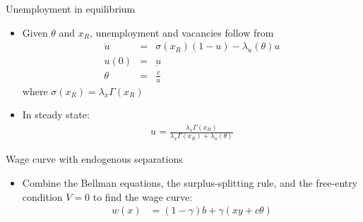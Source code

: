 \documentclass[9pt]{beamer}
\newcommand{\bit}{\begin{itemize}}
\newcommand{\eit}{\end{itemize}}
\newcommand{\lb}{\label}
\begin{document}
\begin{frame}{Unemployment in equilibrium}

\bit
\setlength\itemsep{1em}

\item Given $\theta$ and $x_R$, unemployment and vacancies follow from
\begin{eqnarray}
\dot{u} &=& \sigma(x_R) (1-u) - \lambda_u(\theta)u \nonumber \\
u(0) &=& \underbar{u} \nonumber \\
\theta &=& \frac{v}{u} \nonumber
\end{eqnarray}
where $\sigma(x_R)  = \lambda_x \Gamma(x_R)$

\item In steady state:
\begin{eqnarray}
 u = \frac{\lambda_x \Gamma(x_R)}{\lambda_x \Gamma(x_R) + \lambda_u(\theta)} \nonumber
\end{eqnarray}

\eit
\end{frame}


\begin{frame}{Wage curve with endogenous separations}

\bit
\setlength\itemsep{1.5em}

\item Combine the Bellman equations, the surplus-splitting rule, and the free-entry condition $V=0$ to find the wage curve:
\begin{align}
\lb{ws_rule}
w(x) &= (1-\gamma)b + \gamma (xy+c\theta) \nonumber
\end{align}

\eit
\end{frame}
\end{document}
